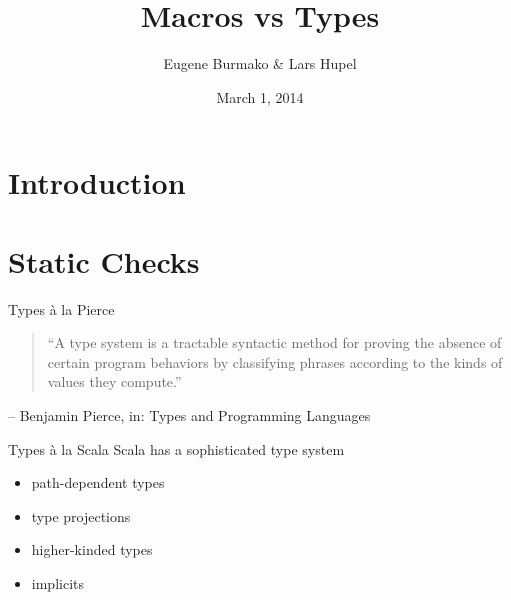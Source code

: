 \documentclass{beamer}
\begin{document}
  \title{Macros vs Types}
  \author{Eugene Burmako \& Lars Hupel}
  \date{March 1, 2014}

\begin{frame}
  \maketitle
\end{frame}

  \section*{Introduction}

\begin{frame}
\end{frame}

\begin{frame}
  \tableofcontents
\end{frame}

\AtBeginSection[]
{
  \begin{frame}
    \tableofcontents[currentsection]
  \end{frame}
}

  \section{Static Checks}

\begin{frame}{Types à la Pierce}
  \begin{quote}
    ``A type system is a tractable syntactic method for \alert<2>{proving the absence of certain program behaviors} by classifying phrases according to the kinds of values they compute.''
  \end{quote}
  \hfill -- Benjamin Pierce, in: Types and Programming Languages
\end{frame}

\begin{frame}{Types à la Scala}
  Scala has a sophisticated type system
  \begin{itemize}
    \item path-dependent types
    \item type projections
    \item higher-kinded types
    \item implicits
  \end{itemize}
\end{frame}
\end{document}
